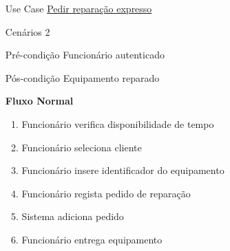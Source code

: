 \documentclass[../relatorio.tex]{subfiles}
\begin{document}
\begin{itemize}
    \item[Use Case] {\underline{Pedir reparação expresso}}
    \item[Cenários] {2}
    \item[Pré-condição] {Funcionário autenticado}
    \item[Pós-condição] {Equipamento reparado}
          \begin{flushleft}
              \textbf{Fluxo Normal}
          \end{flushleft}
          \begin{enumerate}
              \item Funcionário verifica disponibilidade de tempo
              \item Funcionário seleciona cliente
              \item Funcionário insere identificador do equipamento
              \item Funcionário regista pedido de reparação
              \item Sistema adiciona pedido
              \item Funcionário entrega equipamento
          \end{enumerate}


\end{itemize}
\end{document}
